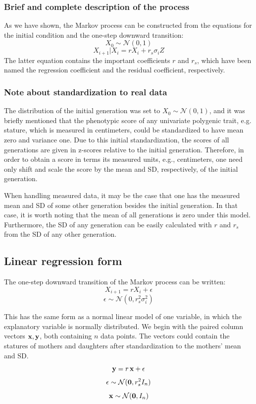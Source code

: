 \documentclass[a4paper,11pt]{article} %
\begin{document}
\subsubsection{Brief and complete description of the process}
As we have shown, the Markov process can be constructed from the equations for the initial condition and the one-step downward transition:
$$X_0 \sim \mathcal{N}(0, 1)$$
$$X_{i+1}|X_i = rX_i+ r_s\sigma_iZ$$
The latter equation contains the important coefficients $r$ and $r_s$, which have been named the regression coefficient and the residual coefficient, respectively. 

\subsubsection*{Note about standardization to real data}
The distribution of the initial generation was set to $X_0 \sim \mathcal{N}(0, 1)$, and it was briefly mentioned that the phenotypic score of any univariate polygenic trait, e.g. stature, which is measured in centimeters, could be standardized to have mean zero and variance one. Due to this initial standardization, the scores of all generations are given in z-scores relative to the initial generation. Therefore, in order to obtain a score in terms its measured units, e.g., centimeters, one need only shift and scale the score by the mean and SD, respectively, of the initial generation. 

When handling measured data, it may be the case that one has the measured mean and SD of some other generation besides the initial generation. In that case, it is worth noting that the mean of all generations is zero under this model. Furthermore, the SD of any generation can be easily calculated with $r$ and $r_s$ from the SD of any other generation.



\subsection{Linear regression form}

The one-step downward transition of the Markov process can be written:
$$X_{i+1} = rX_i + \epsilon$$
$$\epsilon \sim \mathcal{N}(0, r_s^2 \sigma_i^2)$$

This has the same form as a normal linear model of one variable, in which the explanatory variable is normally distributed. We begin with the paired column vectors $\bold{x}, \bold{y}$, both containing $n$ data points. The vectors could contain the statures of mothers and daughters after standardization to the mothers' mean and SD. 
$$\bold{y} = r \, \bold{x} + \bold{\epsilon}$$
$$\bold{\epsilon} \sim \mathcal{N}(\bold{0}, r_s^2 I_n)$$
$$\bold{x} \sim \mathcal{N}(\bold{0}, I_n)$$
\end{document}
